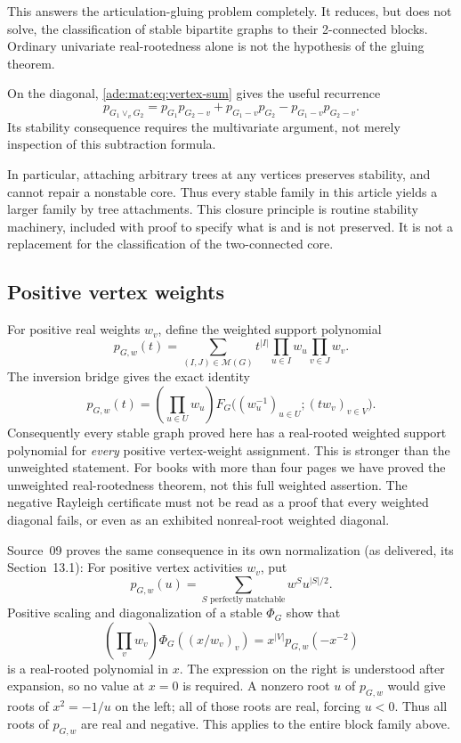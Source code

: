 \documentclass[11pt]{article}
\numberwithin{equation}{section}
\theoremstyle{definition}
\newcommand{\PM}{\mathcal M}
\begin{document}
This answers the articulation-gluing problem completely. It reduces, but
does not solve, the classification of stable bipartite graphs to their
2-connected blocks. Ordinary univariate real-rootedness alone is not the
hypothesis of the gluing theorem.

On the diagonal, \eqref{ade:mat:eq:vertex-sum} gives the useful recurrence
\begin{equation}
 p_{G_1\vee_vG_2}
 =p_{G_1}p_{G_2-v}+p_{G_1-v}p_{G_2}-p_{G_1-v}p_{G_2-v}.
\label{ade:mat:eq:p-vertex}
\end{equation}
Its stability consequence requires the multivariate argument, not merely
inspection of this subtraction formula.

In particular, attaching arbitrary trees at any vertices preserves
stability, and cannot repair a nonstable core.  Thus every stable family
in this article yields a larger family by tree attachments.  This closure
principle is routine stability machinery, included with proof to specify
what is and is not preserved.  It is not a replacement for the
classification of the two-connected core.

\subsection{Positive vertex weights}

For positive real weights $w_v$, define the weighted support polynomial
\begin{equation}
 p_{G,w}(t)=\sum_{(I,J)\in\PM(G)}
       t^{|I|}\prod_{u\in I}w_u\prod_{v\in J}w_v.
 \label{ade:eq:weightedp}
\end{equation}
The inversion bridge gives the exact identity
\begin{equation}
 p_{G,w}(t)=\left(\prod_{u\in U}w_u\right)
 F_G\bigl((w_u^{-1})_{u\in U};(tw_v)_{v\in V}\bigr).
 \label{ade:eq:weightbridge}
\end{equation}
Consequently every stable graph proved here has a real-rooted weighted
support polynomial for \emph{every} positive vertex-weight assignment.
This is stronger than the unweighted statement.
For books with more than four pages we have proved the unweighted
real-rootedness theorem, not this full weighted assertion.  The negative
Rayleigh certificate must not be read as a proof that every weighted
diagonal fails, or even as an exhibited nonreal-root weighted diagonal.

Source~09 proves the same consequence in its own normalization (as
delivered, its Section~13.1):
For positive vertex activities $w_v$, put
\[
 p_{G,w}(u)=\sum_{S\text{ perfectly matchable}}w^S u^{|S|/2}.
\]
Positive scaling and diagonalization of a stable $\Phi_G$ show that
\begin{equation}
 \left(\prod_vw_v\right)\Phi_G((x/w_v)_v)
   =x^{|V|}p_{G,w}(-x^{-2})
\label{ade:mat:eq:weighted-diag}
\end{equation}
is a real-rooted polynomial in $x$. The expression on the right is
understood after expansion, so no value at $x=0$ is required. A nonzero
root $u$ of $p_{G,w}$ would give roots of $x^2=-1/u$ on the left; all of
those roots are real, forcing $u<0$. Thus all roots of $p_{G,w}$ are real
and negative. This applies to the entire block family above.
\end{document}

